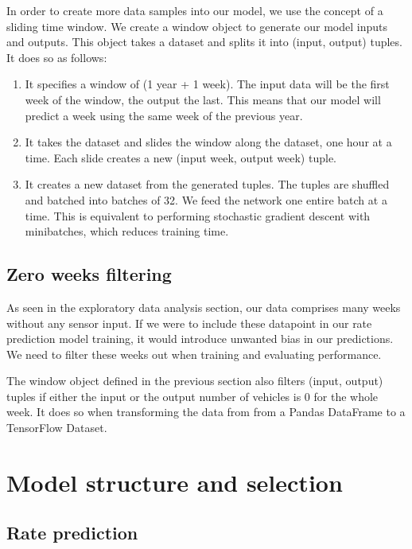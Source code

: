 \documentclass[10pt,conference,compsocconf]{IEEEtran}
\begin{document}
In order to create more data samples into our model, we use the concept of a sliding time window.
We create a window object to generate our model inputs and outputs. This object takes a dataset and 
splits it into (input, output) tuples. It does so as follows:
\begin{enumerate}
    \item  It specifies a window of (1 year + 1 week). The input data will be the first week of the
    window, the output the last. This means that our model will predict a week using the same week 
    of the previous year.
    \item  It takes the dataset and slides the window along the dataset, one hour at a time. 
    Each slide creates a new (input week, output week) tuple.
    \item It creates a new dataset from the generated tuples. The tuples are shuffled and batched into
    batches of 32. We feed the network one entire batch at a time. This is equivalent to performing
    stochastic gradient descent with minibatches, which reduces training time.
\end{enumerate}

\subsection{Zero weeks filtering}

As seen in the exploratory data analysis section, our data comprises many weeks without any sensor input. If we were to include these datapoint in our rate prediction model training, it would introduce unwanted bias in our predictions. We need to filter these weeks out when training and evaluating performance. 

The window object defined in the previous section also filters (input, output) tuples if either the input or the output number of  vehicles is 0 for the whole week. It does so when transforming the data from from a Pandas DataFrame to a TensorFlow Dataset.


\section{Model structure and selection}

\subsection{Rate prediction}
\end{document}
